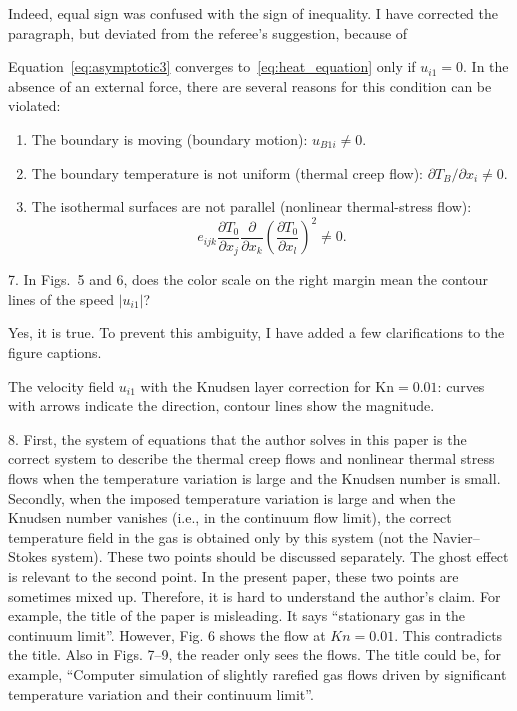 \documentclass{article}
\newcommand{\Kn}{\mathrm{Kn}}
\newcommand{\pder}[2][]{\frac{\partial#1}{\partial#2}}
\newcommand{\Pder}[2][]{\partial#1/\partial#2}
\begin{document}
Indeed, equal sign was confused with the sign of inequality.
I have corrected the paragraph, but deviated from the referee's suggestion,
because of 
\begin{leftbar}
Equation~\eqref{eq:asymptotic3} converges to~\eqref{eq:heat_equation} only if \(u_{i1} = 0\).
In the absence of an external force, there are several reasons for this condition can be violated:
\begin{enumerate}
	\item The boundary is moving (boundary motion): \(u_{B1i} \neq 0 \).
	\item The boundary temperature is not uniform (thermal creep flow): \(\Pder[T_B]{x_i} \neq 0 \).
	\item The isothermal surfaces are not parallel (nonlinear thermal-stress flow):
		\begin{equation}\label{eq:equilibrium}
			e_{ijk}\pder[T_0]{x_j}\pder{x_k}\left(\pder[T_0]{x_l}\right)^2 \neq 0.
		\end{equation}
\end{enumerate}
\end{leftbar}

\begin{quoting} 
7. In Figs.~5 and 6, does the color scale on the right margin mean the
contour lines of the speed \(|u_{i1}|\)?
\end{quoting}

Yes, it is true. To prevent this ambiguity, I have added a few clarifications to the figure captions.

\begin{leftbar}
The velocity field \(u_{i1}\) with the Knudsen layer correction for \(\Kn=0.01\):
curves with arrows indicate the direction, contour lines show the magnitude.
\end{leftbar}

\begin{quoting} 
8. First, the system of equations that the author solves in this paper
is the correct system to describe the thermal creep flows and nonlinear
thermal stress flows when the temperature variation is large and the
Knudsen number is small. Secondly, when the imposed temperature
variation is large and when the Knudsen number vanishes (i.e., in the
continuum flow limit), the correct temperature field in the gas is
obtained only by this system (not the Navier--Stokes system). These two
points should be discussed separately. The ghost effect is relevant to
the second point. In the present paper, these two points are sometimes
mixed up. Therefore, it is hard to understand the author's claim. For
example, the title of the paper is misleading. It says ``stationary gas
in the continuum limit''. However, Fig. 6 shows the flow at \(Kn=0.01\).
This contradicts the title. Also in Figs. 7--9, the reader only sees the
flows. The title could be, for example, ``Computer simulation of
slightly rarefied gas flows driven by significant temperature variation
and their continuum limit''.
\end{quoting}
\end{document}
